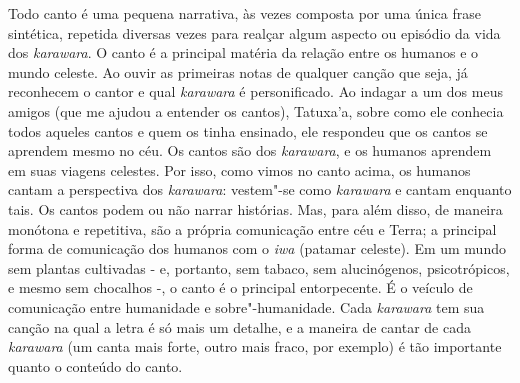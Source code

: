 Todo canto é uma pequena narrativa, às vezes composta por uma única
frase sintética, repetida diversas vezes para realçar algum aspecto ou
episódio da vida dos \emph{karawara}. O canto é a principal matéria da
relação entre os humanos e o mundo celeste. Ao ouvir as primeiras notas
de qualquer canção que seja, já reconhecem o cantor e qual
\emph{karawara} é personificado. Ao indagar a um dos meus amigos (que me
ajudou a entender os cantos), Tatuxa'a, sobre como ele conhecia todos
aqueles cantos e quem os tinha ensinado, ele respondeu que os cantos se
aprendem mesmo no céu. Os cantos são dos \emph{karawara}, e os humanos
aprendem em suas viagens celestes. Por isso, como vimos no canto acima,
os humanos cantam a perspectiva dos \emph{karawara}: vestem"-se como
\emph{karawara} e cantam enquanto tais. Os cantos podem ou não narrar
histórias. Mas, para além disso, de maneira monótona e repetitiva, são a
própria comunicação entre céu e Terra; a principal forma de comunicação
dos humanos com o \emph{iwa} (patamar celeste). Em um mundo sem plantas
cultivadas - e, portanto, sem tabaco, sem alucinógenos, psicotrópicos, e
mesmo sem chocalhos -, o canto é o principal entorpecente. É o veículo
de comunicação entre humanidade e sobre"-humanidade. Cada \emph{karawara}
tem sua canção na qual a letra é só mais um detalhe, e a maneira de
cantar de cada \emph{karawara} (um canta mais forte, outro mais fraco,
por exemplo) é tão importante quanto o conteúdo do canto.

